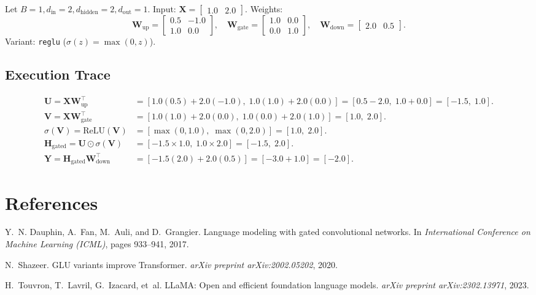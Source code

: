\documentclass[11pt]{article}
\begin{document}
Let $B = 1, d_{\text{in}} = 2, d_{\text{hidden}} = 2, d_{\text{out}} = 1$.
Input: $\mathbf{X} = \begin{bmatrix} 1.0 & 2.0 \end{bmatrix}$.
Weights:
\begin{equation}
\mathbf{W}_{\text{up}} = \begin{bmatrix} 0.5 & -1.0 \\ 1.0 & 0.0 \end{bmatrix}, \quad
\mathbf{W}_{\text{gate}} = \begin{bmatrix} 1.0 & 0.0 \\ 0.0 & 1.0 \end{bmatrix}, \quad
\mathbf{W}_{\text{down}} = \begin{bmatrix} 2.0 & 0.5 \end{bmatrix}.
\end{equation}
Variant: \texttt{reglu} ($\sigma(z) = \max(0, z)$).

\subsection{Execution Trace}
\begin{align}
\mathbf{U} = \mathbf{X} \mathbf{W}_{\text{up}}^\top &= [1.0(0.5) + 2.0(-1.0), \; 1.0(1.0) + 2.0(0.0)] = [0.5 - 2.0, \; 1.0 + 0.0] = [-1.5, \; 1.0]. \\
\mathbf{V} = \mathbf{X} \mathbf{W}_{\text{gate}}^\top &= [1.0(1.0) + 2.0(0.0), \; 1.0(0.0) + 2.0(1.0)] = [1.0, \; 2.0]. \\
\sigma(\mathbf{V}) = \text{ReLU}(\mathbf{V}) &= [\max(0, 1.0), \; \max(0, 2.0)] = [1.0, \; 2.0]. \\
\mathbf{H}_{\text{gated}} = \mathbf{U} \odot \sigma(\mathbf{V}) &= [-1.5 \times 1.0, \; 1.0 \times 2.0] = [-1.5, \; 2.0]. \\
\mathbf{Y} = \mathbf{H}_{\text{gated}} \mathbf{W}_{\text{down}}^\top &= [-1.5(2.0) + 2.0(0.5)] = [-3.0 + 1.0] = [-2.0].
\end{align}

\section{References}
\label{sec:references}

\begin{thebibliography}{9}
Y.~N. Dauphin, A.~Fan, M.~Auli, and D.~Grangier.
\newblock Language modeling with gated convolutional networks.
\newblock In \emph{International Conference on Machine Learning (ICML)}, pages 933--941, 2017.

N.~Shazeer.
\newblock GLU variants improve Transformer.
\newblock \emph{arXiv preprint arXiv:2002.05202}, 2020.

H.~Touvron, T.~Lavril, G.~Izacard, et~al.
\newblock LLaMA: Open and efficient foundation language models.
\newblock \emph{arXiv preprint arXiv:2302.13971}, 2023.
\end{thebibliography}
\end{document}
